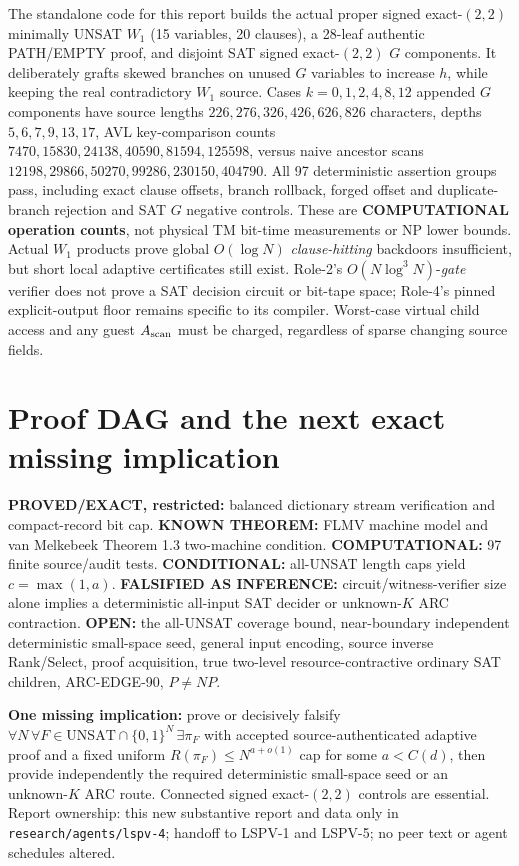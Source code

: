 \documentclass[11pt]{article}
\begin{document}
The standalone code for this report builds the actual proper signed exact-$(2,2)$ minimally UNSAT \(W_1\) (15 variables, 20 clauses), a 28-leaf authentic PATH/EMPTY proof, and disjoint SAT signed exact-$(2,2)$ \(G\) components. It deliberately grafts skewed branches on unused \(G\) variables to increase \(h\), while keeping the real contradictory \(W_1\) source. Cases \(k=0,1,2,4,8,12\) appended \(G\) components have source lengths \(226,276,326,426,626,826\) characters, depths \(5,6,7,9,13,17\), AVL key-comparison counts \(7470,15830,24138,40590,81594,125598\), versus naive ancestor scans \(12198,29866,50270,99286,230150,404790\). All 97 deterministic assertion groups pass, including exact clause offsets, branch rollback, forged offset and duplicate-branch rejection and SAT \(G\) negative controls. These are \textbf{COMPUTATIONAL operation counts}, not physical TM bit-time measurements or NP lower bounds. Actual \(W_1\) products prove global \(O(\log N)\) \emph{clause-hitting} backdoors insufficient, but short local adaptive certificates still exist. Role-2's \(O(N\log^3N)\)-\emph{gate} verifier does not prove a SAT decision circuit or bit-tape space; Role-4's pinned explicit-output floor remains specific to its compiler. Worst-case virtual child access and any guest \(A_{\rm scan}\) must be charged, regardless of sparse changing source fields.

\section{Proof DAG and the next exact missing implication}
\noindent\textbf{PROVED/EXACT, restricted:} balanced dictionary stream verification and compact-record bit cap. \textbf{KNOWN THEOREM:} FLMV machine model and van Melkebeek Theorem 1.3 two-machine condition. \textbf{COMPUTATIONAL:} 97 finite source/audit tests. \textbf{CONDITIONAL:} all-UNSAT length caps yield \(c=\max(1,a)\). \textbf{FALSIFIED AS INFERENCE:} circuit/witness-verifier size alone implies a deterministic all-input SAT decider or unknown-\(K\) ARC contraction. \textbf{OPEN:} the all-UNSAT coverage bound, near-boundary independent deterministic small-space seed, general input encoding, source inverse Rank/Select, proof acquisition, true two-level resource-contractive ordinary SAT children, ARC-EDGE-90, \(P\ne NP\).

\noindent\textbf{One missing implication:} prove or decisively falsify \(\forall N\,\forall F\in\mathrm{UNSAT}\cap\{0,1\}^N\,\exists\pi_F\) with accepted source-authenticated adaptive proof and a fixed uniform \(R(\pi_F)\le N^{a+o(1)}\) cap for some \(a<C(d)\), then provide independently the required deterministic small-space seed or an unknown-\(K\) ARC route. Connected signed exact-$(2,2)$ controls are essential. Report ownership: this new substantive report and data only in \texttt{research/agents/lspv-4}; handoff to LSPV-1 and LSPV-5; no peer text or agent schedules altered.
\end{document}
